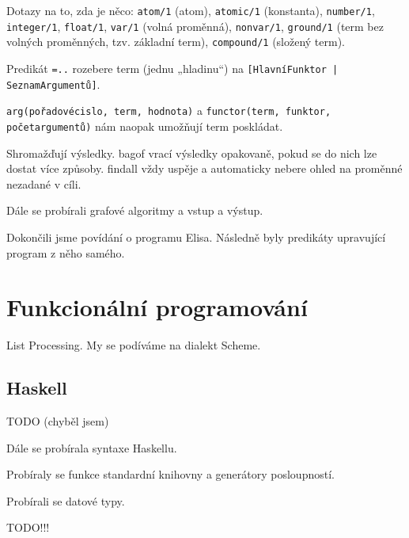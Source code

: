 \documentclass[12pt]{article}					%
\begin{document}
\begin{definice}
	Dotazy na to, zda je něco: \verb|atom/1| (atom), \verb|atomic/1| (konstanta), \verb|number/1|, \verb|integer/1|, \verb|float/1|, \verb|var/1| (volná proměnná), \verb|nonvar/1|, \verb|ground/1| (term bez volných proměnných, tzv. základní term), \verb|compound/1| (složený term).
\end{definice}

\begin{definice}[univ]
	Predikát \verb|=..| rozebere term (jednu „hladinu“) na \verb![HlavníFunktor | SeznamArgumentů]!.
\end{definice}

\begin{definice}
	\verb|arg(pořadovécislo, term, hodnota)| a \verb|functor(term, funktor, početargumentů)| nám naopak umožňují term poskládat.
\end{definice}

\begin{definice}
	Shromažďují výsledky. bagof vrací výsledky opakovaně, pokud se do nich lze dostat více způsoby. findall vždy uspěje a automaticky nebere ohled na proměnné nezadané v cíli.
\end{definice}


Dále se probírali grafové algoritmy a vstup a výstup.


Dokončili jsme povídání o programu Elisa. Následně byly predikáty upravující program z něho samého.

\section{Funkcionální programování}
\begin{definice}[LISP]
	List Processing. My se podíváme na dialekt Scheme.
\end{definice}

\subsection{Haskell}


TODO (chyběl jsem)


\begin{poznamka}
	Dále se probírala syntaxe Haskellu.
\end{poznamka}


\begin{poznamka}
	Probíraly se funkce standardní knihovny a generátory posloupností.
\end{poznamka}


\begin{poznamka}
	Probírali se datové typy.
\end{poznamka}


TODO!!!
	
\end{document}
